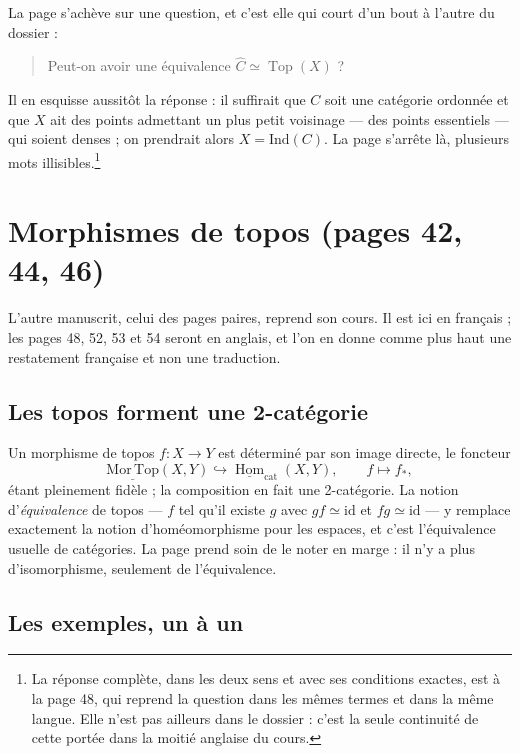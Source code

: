 \documentclass[11pt,a4paper]{article}
\begin{document}
La page s'achève sur une question, et c'est elle qui court d'un bout à l'autre
du dossier :

\begin{quote}
Peut-on avoir une équivalence $\widehat{C} \simeq \operatorname{Top}(X)$ ?
\end{quote}

Il en esquisse aussitôt la réponse : il suffirait que $C$ soit une catégorie
ordonnée et que $X$ ait des points admettant un plus petit voisinage — des
points essentiels — qui soient denses ; on prendrait alors $X = \mathrm{Ind}(C)$.
La page s'arrête là, plusieurs mots illisibles.\footnote{La réponse complète,
dans les deux sens et avec ses conditions exactes, est à la page 48,
qui reprend la question dans les mêmes termes et dans la même langue. Elle
n'est pas ailleurs dans le dossier : c'est la seule continuité de cette
portée dans la moitié anglaise du cours.}

\section*{Morphismes de topos (pages 42, 44, 46)}

L'autre manuscrit, celui des pages paires, reprend son cours. Il est ici en
français ; les pages 48, 52, 53 et 54 seront en anglais, et l'on en donne comme
plus haut une restatement française et non une traduction.

\subsection*{Les topos forment une 2-catégorie}

Un morphisme de topos $f : X \to Y$ est déterminé par son image directe, le
foncteur
\[
\underline{\mathrm{Mor\,Top}}(X,Y) \hookrightarrow
\underline{\operatorname{Hom}}_{\mathrm{cat}}(X,Y), \qquad f \mapsto f_{*},
\]
étant pleinement fidèle ; la composition en fait une 2-catégorie. La notion
d'\emph{équivalence} de topos — $f$ tel qu'il existe $g$ avec $gf \simeq
\mathrm{id}$ et $fg \simeq \mathrm{id}$ — y remplace exactement la notion
d'homéomorphisme pour les espaces, et c'est l'équivalence usuelle de
catégories. La page prend soin de le noter en marge : il n'y a plus
d'isomorphisme, seulement de l'équivalence.

\subsection*{Les exemples, un à un}
\end{document}
